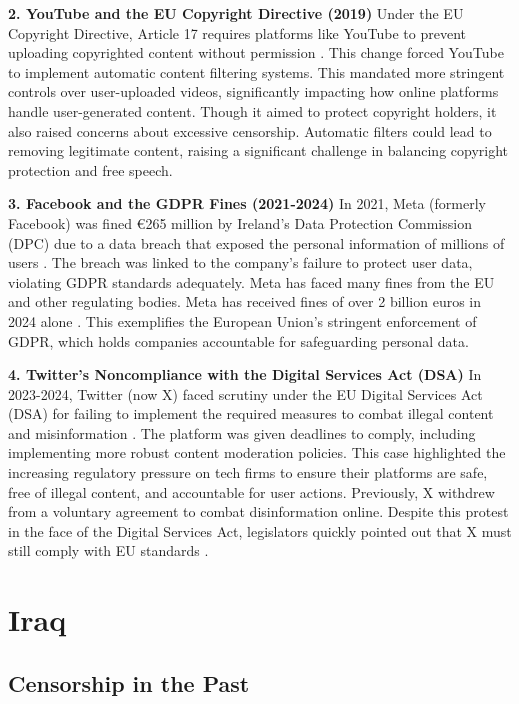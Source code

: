 \textbf{2. YouTube and the EU Copyright Directive (2019)}
Under the EU Copyright Directive, Article 17 requires platforms like YouTube to prevent uploading copyrighted content without permission \cite{eu2019}. This change forced YouTube to implement automatic content filtering systems. This mandated more stringent controls over user-uploaded videos, significantly impacting how online platforms handle user-generated content. Though it aimed to protect copyright holders, it also raised concerns about excessive censorship. Automatic filters could lead to removing legitimate content, raising a significant challenge in balancing copyright protection and free speech.

\textbf{3. Facebook and the GDPR Fines (2021-2024)}
In 2021, Meta (formerly Facebook) was fined €265 million by Ireland's Data Protection Commission (DPC) due to a data breach that exposed the personal information of millions of users \cite{facebook2023}. The breach was linked to the company's failure to protect user data, violating GDPR standards adequately. Meta has faced many fines from the EU and other regulating bodies. Meta has received fines of over 2 billion euros in 2024 alone \cite{FBFines}. This exemplifies the European Union's stringent enforcement of GDPR, which holds companies accountable for safeguarding personal data. 

\textbf{4. Twitter's Noncompliance with the Digital Services Act (DSA)}
In 2023-2024, Twitter (now X) faced scrutiny under the EU Digital Services Act (DSA) for failing to implement the required measures to combat illegal content and misinformation \cite{twitter2023}. The platform was given deadlines to comply, including implementing more robust content moderation policies. This case highlighted the increasing regulatory pressure on tech firms to ensure their platforms are safe, free of illegal content, and accountable for user actions. Previously, X withdrew from a voluntary agreement to combat disinformation online. Despite this protest in the face of the Digital Services Act, legislators quickly pointed out that X must still comply with EU standards \cite{bhr2023}.

\section{Iraq}
\label{sec:Iraq-Censorship}

\subsection{Censorship in the Past}

